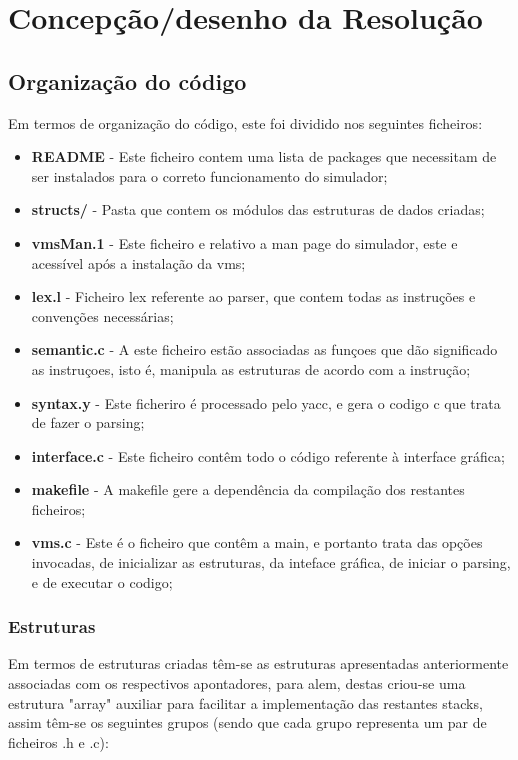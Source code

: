 \documentclass{report}
\begin{document}
\chapter{Concepção/desenho da Resolução}
\section{Organização do código}

Em termos de organização do código, este foi dividido nos seguintes ficheiros:

\begin{itemize}
\item \textbf{README} - Este ficheiro contem uma lista de packages que necessitam de ser instalados para o correto funcionamento do simulador;
\item \textbf{structs/} - Pasta que contem os módulos das estruturas de dados criadas;
\item \textbf{vmsMan.1} - Este ficheiro e relativo a man page do simulador, este e acessível após a instalação da vms;
\item \textbf{lex.l} - Ficheiro lex referente ao parser, que contem todas as instruções e convenções necessárias;
\item \textbf{semantic.c} - A este ficheiro estão associadas as funçoes que dão significado as instruçoes, isto é, manipula as estruturas de acordo com a instrução;
\item \textbf{syntax.y} - Este ficheriro é processado pelo yacc, e gera o codigo c que trata de fazer o parsing;
\item \textbf{interface.c} - Este ficheiro contêm todo o código referente à interface gráfica;
\item \textbf{makefile} - A makefile gere a dependência da compilação dos restantes ficheiros;
\item \textbf{vms.c} - Este é o ficheiro que contêm a main, e portanto trata das opções invocadas, de inicializar as estruturas, da inteface gráfica, de iniciar o parsing, e de executar o codigo;
\end{itemize}

\subsection{Estruturas}

Em termos de estruturas criadas têm-se as estruturas apresentadas anteriormente associadas com os respectivos apontadores, para alem, destas criou-se uma estrutura "array" auxiliar para facilitar a implementação das restantes stacks, assim têm-se os seguintes grupos
(sendo que cada grupo representa um par de ficheiros .h e .c):
\end{document}
